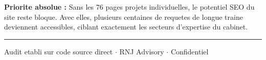 \documentclass[12pt, a4paper]{article}
\begin{document}
\begin{infobox}
\textbf{Priorite absolue :} Sans les 76 pages projets individuelles, le potentiel
SEO du site reste bloque. Avec elles, plusieurs centaines de requetes de longue
traine deviennent accessibles, ciblant exactement les secteurs d'expertise du cabinet.
\end{infobox}

\vspace{2em}
\textcolor{rnjolive}{\rule{\linewidth}{0.4pt}}
\begin{center}
  \textcolor{gris}{\small Audit etabli sur code source direct $\cdot$ RNJ Advisory $\cdot$ Confidentiel}
\end{center}
\end{document}
